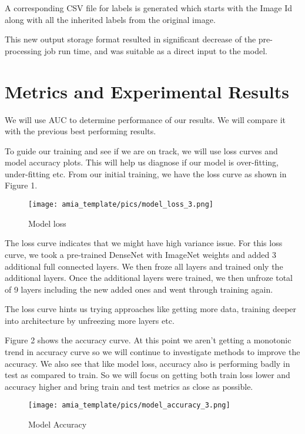 \documentclass{amia}
\begin{document}
A corresponding CSV file for labels is generated which starts with the Image Id along with all the inherited labels from the original image.

This new output storage format resulted in significant decrease of the pre-processing job run time, and was suitable as a direct input to the model.



\section*{Metrics and Experimental Results}
We will use AUC to determine performance of our results. We will compare it with the previous best performing results.

To guide our training and see if we are on track, we will use loss curves and model accuracy plots. This will help us diagnose if our model is over-fitting, under-fitting etc. From our initial training, we have the loss curve as shown in Figure 1.

\begin{figure}[h!]
\centering
\texttt{[image: amia\_template/pics/model\_loss\_3.png]}
\caption{Model loss}
\label{fig1}
\end{figure}

The loss curve indicates that we might have high variance issue. For this loss curve, we took a pre-trained DenseNet with ImageNet weights and added 3 additional full connected layers. We then froze all layers and trained only the additional layers. Once the additional layers were trained, we then unfroze total of 9 layers including the new added ones and went through training again.

The loss curve hints us trying approaches like getting more data, training deeper into architecture by unfreezing more layers etc.

Figure 2 shows the accuracy curve. At this point we aren't getting a monotonic trend in accuracy curve so we will continue to investigate methods to improve the accuracy. We also see that like model loss, accuracy also is performing badly in test as compared to train. So we will focus on getting both train loss lower and accuracy higher and bring train and test metrics as close as possible.

\begin{figure}[h!]
\centering
\texttt{[image: amia\_template/pics/model\_accuracy\_3.png]}
\caption{Model Accuracy}
\label{fig2}
\end{figure}
\end{document}
